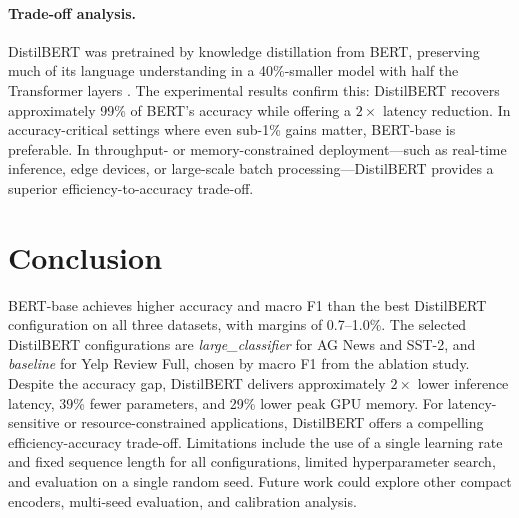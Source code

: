 \documentclass{article}
\begin{document}
\paragraph{Trade-off analysis.}
DistilBERT was pretrained by knowledge distillation from BERT, preserving much of its language understanding in a 40\%-smaller model with half the Transformer layers \citep{sanh2019distilbert}. The experimental results confirm this: DistilBERT recovers approximately 99\% of BERT's accuracy while offering a $2\times$ latency reduction. In accuracy-critical settings where even sub-1\% gains matter, BERT-base is preferable. In throughput- or memory-constrained deployment---such as real-time inference, edge devices, or large-scale batch processing---DistilBERT provides a superior efficiency-to-accuracy trade-off.

\section{Conclusion}
BERT-base achieves higher accuracy and macro F1 than the best DistilBERT configuration on all three datasets, with margins of 0.7--1.0\%. The selected DistilBERT configurations are \emph{large\_classifier} for AG News and SST-2, and \emph{baseline} for Yelp Review Full, chosen by macro F1 from the ablation study. Despite the accuracy gap, DistilBERT delivers approximately $2\times$ lower inference latency, 39\% fewer parameters, and 29\% lower peak GPU memory. For latency-sensitive or resource-constrained applications, DistilBERT offers a compelling efficiency-accuracy trade-off. Limitations include the use of a single learning rate and fixed sequence length for all configurations, limited hyperparameter search, and evaluation on a single random seed. Future work could explore other compact encoders, multi-seed evaluation, and calibration analysis.

\clearpage


\end{document}

